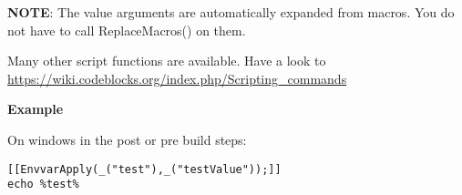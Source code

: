 \textbf{NOTE}: The value arguments are automatically expanded from macros. You do not have to call ReplaceMacros() on them.

Many other script functions are available. Have a look to \url{https://wiki.codeblocks.org/index.php/Scripting_commands}

\textbf{Example}

On windows in the post or pre build steps:
\begin{lstlisting}
[[EnvvarApply(_("test"),_("testValue"));]]
echo %test%
\end{lstlisting}

